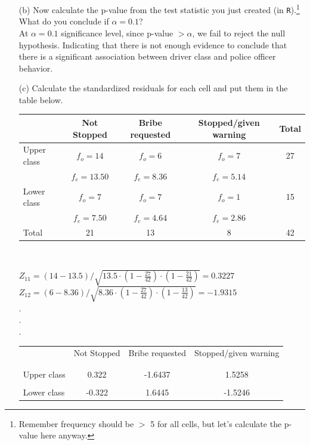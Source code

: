 \documentclass[12pt,letterpaper]{article}
\begin{document}
\begin{enumerate}
	\newpage
	\item [(b)]
	Now calculate the p-value from the test statistic you just created (in \texttt{R}).\footnote{Remember frequency should be $>$ 5 for all cells, but let's calculate the p-value here anyway.}  What do you conclude if $\alpha = 0.1$?\\
	
	 
	At $\alpha = 0.1$ significance level, since p-value $> \alpha$, we fail to reject the null hypothesis. Indicating that there is not enough evidence to conclude that there is a significant association between driver class and police officer behavior.\\
	
	\item [(c)] Calculate the standardized residuals for each cell and put them in the table below.
	\vspace{1cm}
	
		\begin{tabular}{|l|c|c|c|c|}
		\hline
		& Not Stopped & Bribe requested & Stopped/given warning & Total \\
		\hline
		Upper class & $f_o=14$ & $f_o=6$ & $f_o=7$ & 27 \\
		& $f_e = 13.50$ & $f_e = 8.36$ & $f_e = 5.14$ & \\
		\hline
		Lower class & $f_o=7$ & $f_o=7$ & $f_o=1$ & 15 \\
		& $f_e = 7.50$ & $f_e = 4.64$ & $f_e = 2.86$ & \\
		\hline
		Total & 21 & 13 & 8 & 42 \\
		\hline
	\end{tabular}\\
	\vspace{1cm}
	
	 $Z_{11} = (14 - 13.5) / \sqrt{13.5 \cdot \left( 1 - \frac{27}{42} \right) \cdot \left( 1 - \frac{21}{42} \right)} = 0.3227$\\
	 $Z_{12} = (6 - 8.36) / \sqrt{8.36 \cdot \left( 1 - \frac{27}{42} \right) \cdot \left( 1 - \frac{13}{42} \right)} = -1.9315$\\
	 .\\
	 .\\
	 .\\
	
	\begin{table}[h]
		\centering
		\begin{tabular}{l | c c c }
			& Not Stopped & Bribe requested & Stopped/given warning \\
			\\[-1.8ex] 
			\hline \\[-1.8ex]
			Upper class & 0.322 & -1.6437 & 1.5258 \\
			\\
			Lower class & -0.322 & 1.6445 & -1.5246  \\
			

\end{tabular}
\end{table}
\end{enumerate}
\end{document}
